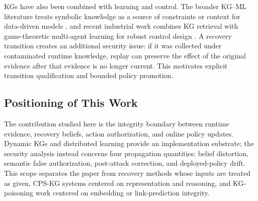 KGs have also been combined with learning and control. The broader KG--ML literature treats symbolic knowledge as a source of constraints or context for data-driven models \cite{damato2023machine}, and recent industrial work combines KG retrieval with game-theoretic multi-agent learning for robust control design \cite{rodrigues2026agentic}. A recovery transition creates an additional security issue: if it was collected under contaminated runtime knowledge, replay can preserve the effect of the original evidence after that evidence is no longer current. This motivates explicit transition qualification and bounded policy promotion.

\subsection{Positioning of This Work}
The contribution studied here is the integrity boundary between runtime evidence, recovery beliefs, action authorization, and online policy updates. Dynamic KGs and distributed learning provide an implementation substrate; the security analysis instead concerns four propagation quantities: belief distortion, semantic false authorization, post-attack correction, and deployed-policy drift. This scope separates the paper from recovery methods whose inputs are treated as given, CPS-KG systems centered on representation and reasoning, and KG-poisoning work centered on embedding or link-prediction integrity.
